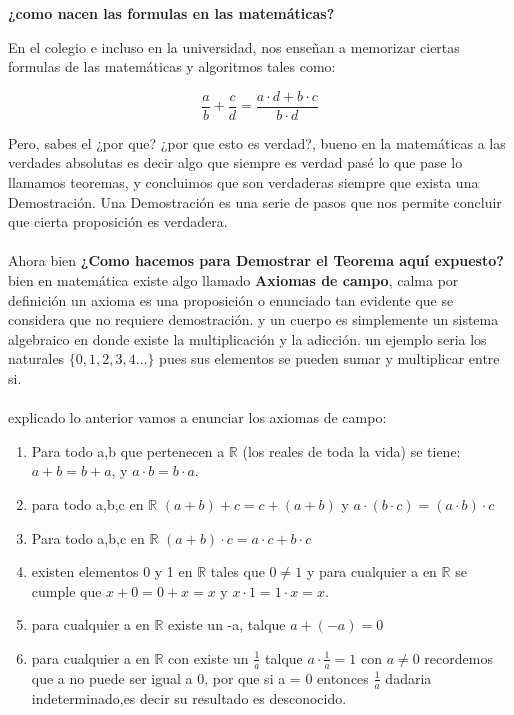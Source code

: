 \documentclass{article}
\begin{document}
\begin{center}
    \textbf{¿como nacen las formulas en las matemáticas?}
\end{center}
En el colegio e incluso en la universidad, nos enseñan a memorizar ciertas formulas de las matemáticas y algoritmos tales como:

    \begin{equation*}
        \frac{a}{b}+\frac{c}{d}=\frac{a \cdot d + b \cdot c}{b \cdot d}
    \end{equation*}

Pero, sabes el ¿por que? ¿por que esto es verdad?, bueno en la matemáticas a las verdades absolutas
es decir algo que siempre es verdad pasé lo que pase lo llamamos teoremas, y concluimos que son verdaderas 
siempre que exista una Demostración. Una Demostración es una serie de pasos que nos permite concluir 
que cierta proposición es verdadera.
\\
\\ 
Ahora bien \textbf{¿Como hacemos para Demostrar el Teorema aquí expuesto?} bien en matemática existe 
algo llamado \textbf{Axiomas de campo}, calma por definición un axioma es una proposición o enunciado tan evidente que se considera que no requiere demostración.
y un cuerpo es simplemente un  sistema algebraico en donde existe la multiplicación y la adicción.
un ejemplo seria los naturales $\{0,1,2,3,4...\}$ pues sus elementos se pueden sumar y multiplicar entre si.
\\
\\ 
explicado lo anterior vamos a enunciar los axiomas de campo:
\begin{enumerate}
    \item Para todo a,b que pertenecen a $\mathbb R$ (los reales de toda la vida) se tiene: 
    $a + b = b + a$, y $a \cdot b = b \cdot a$.
    \item para todo a,b,c en $\mathbb R$ $(a+b)+c = c+(a+b)$ y $a \cdot (b \cdot c)= (a \cdot b) \cdot c$
    \item Para todo a,b,c en  $\mathbb R$ $(a + b) \cdot c = a \cdot c + b \cdot c $
    \item existen elementos 0 y 1 en $\mathbb{R}$ tales que $0 \not = 1$ y para cualquier a en $\mathbb R$ se cumple que 
    $x + 0 = 0 + x = x$ y $x \cdot 1 = 1 \cdot x = x.$
    \item para cualquier a en $\mathbb R$ existe un -a, talque $a+(-a)=0$
    \item para cualquier a en $\mathbb R$ con existe un $\frac{1}{a}$ talque $a \cdot \frac{1}{a} = 1$ con $ a \not = 0$ 
    recordemos que a no puede ser igual a 0, por que si a = 0 entonces $\frac{1}{a}$ dadaria indeterminado,es decir su resultado es desconocido.
\end{enumerate}
\end{document}
